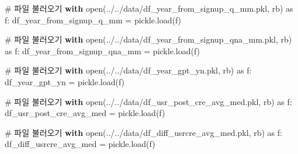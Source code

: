 \documentclass[
  letterpaper,
  DIV=11,
  numbers=noendperiod]{scrartcl}
\newenvironment{Shaded}{\begin{snugshade}}{\end{snugshade}}
\newcommand{\BuiltInTok}[1]{\textcolor[rgb]{0.00,0.23,0.31}{#1}}
\newcommand{\CommentTok}[1]{\textcolor[rgb]{0.37,0.37,0.37}{#1}}
\newcommand{\ControlFlowTok}[1]{\textcolor[rgb]{0.00,0.23,0.31}{\textbf{#1}}}
\newcommand{\ImportTok}[1]{\textcolor[rgb]{0.00,0.46,0.62}{#1}}
\newcommand{\NormalTok}[1]{\textcolor[rgb]{0.00,0.23,0.31}{#1}}
\newcommand{\OperatorTok}[1]{\textcolor[rgb]{0.37,0.37,0.37}{#1}}
\newcommand{\StringTok}[1]{\textcolor[rgb]{0.13,0.47,0.30}{#1}}
\begin{document}
\begin{Shaded}
\begin{Highlighting}[]
\CommentTok{\# 파일 불러오기}
\ControlFlowTok{with} \BuiltInTok{open}\NormalTok{(}\StringTok{\textquotesingle{}../../data/df\_year\_from\_signup\_q\_mm.pkl\textquotesingle{}}\NormalTok{, }\StringTok{\textquotesingle{}rb\textquotesingle{}}\NormalTok{) }\ImportTok{as}\NormalTok{ f:}
\NormalTok{    df\_year\_from\_signup\_q\_mm }\OperatorTok{=}\NormalTok{ pickle.load(f)}
\end{Highlighting}
\end{Shaded}

\begin{Shaded}
\begin{Highlighting}[]
\CommentTok{\# 파일 불러오기}
\ControlFlowTok{with} \BuiltInTok{open}\NormalTok{(}\StringTok{\textquotesingle{}../../data/df\_year\_from\_signup\_qna\_mm.pkl\textquotesingle{}}\NormalTok{, }\StringTok{\textquotesingle{}rb\textquotesingle{}}\NormalTok{) }\ImportTok{as}\NormalTok{ f:}
\NormalTok{    df\_year\_from\_signup\_qna\_mm }\OperatorTok{=}\NormalTok{ pickle.load(f)}
\end{Highlighting}
\end{Shaded}

\begin{Shaded}
\begin{Highlighting}[]
\CommentTok{\# 파일 불러오기}
\ControlFlowTok{with} \BuiltInTok{open}\NormalTok{(}\StringTok{\textquotesingle{}../../data/df\_year\_gpt\_yn.pkl\textquotesingle{}}\NormalTok{, }\StringTok{\textquotesingle{}rb\textquotesingle{}}\NormalTok{) }\ImportTok{as}\NormalTok{ f:}
\NormalTok{    df\_year\_gpt\_yn }\OperatorTok{=}\NormalTok{ pickle.load(f)}
\end{Highlighting}
\end{Shaded}

\begin{Shaded}
\begin{Highlighting}[]
\CommentTok{\# 파일 불러오기}
\ControlFlowTok{with} \BuiltInTok{open}\NormalTok{(}\StringTok{\textquotesingle{}../../data/df\_usr\_post\_cre\_avg\_med.pkl\textquotesingle{}}\NormalTok{, }\StringTok{\textquotesingle{}rb\textquotesingle{}}\NormalTok{) }\ImportTok{as}\NormalTok{ f:}
\NormalTok{    df\_usr\_post\_cre\_avg\_med }\OperatorTok{=}\NormalTok{ pickle.load(f)}
\end{Highlighting}
\end{Shaded}

\begin{Shaded}
\begin{Highlighting}[]
\CommentTok{\# 파일 불러오기}
\ControlFlowTok{with} \BuiltInTok{open}\NormalTok{(}\StringTok{\textquotesingle{}../../data/df\_diff\_usrcre\_avg\_med.pkl\textquotesingle{}}\NormalTok{, }\StringTok{\textquotesingle{}rb\textquotesingle{}}\NormalTok{) }\ImportTok{as}\NormalTok{ f:}
\NormalTok{    df\_diff\_usrcre\_avg\_med }\OperatorTok{=}\NormalTok{ pickle.load(f)}
\end{Highlighting}
\end{Shaded}
\end{document}
